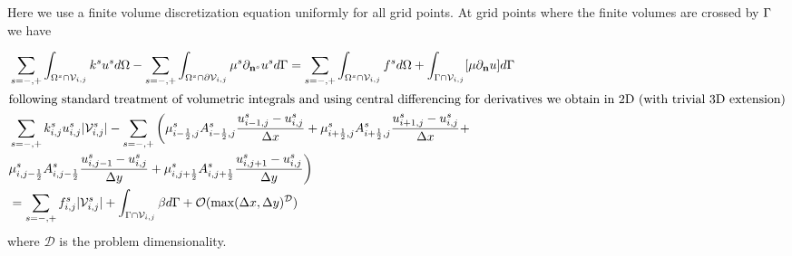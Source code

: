 \documentclass{elsarticle}
\begin{document}
Here we use a finite volume discretization equation uniformly for all grid points. At grid points where the finite volumes are crossed by $\rm \Gamma$ we have

\begin{align*}
	 & \sum_{s=-,+}\int_{\Omega^s \cap \mathcal{V}_{i,j}}  k^{s} u^{s} d\Omega -\sum_{s=-,+} \int_{\Omega^s\cap \partial\mathcal{V}_{i,j}} \mu^{s}\partial_{\mathbf{n}^s} u^s  d\Gamma = \sum_{s=-,+}\int_{\Omega^s \cap \mathcal{V}_{i,j}}  f^{s} d\Omega + \int_{\Gamma \cap \mathcal{V}_{i,j}}[\mu\partial_{\mathbf{n}}u]d\Gamma \\
	\intertext{following standard treatment of volumetric integrals and using central differencing for derivatives we obtain in 2D (with trivial 3D extension)}
	 & \sum_{s=-,+} k_{i,j}^s u_{i,j}^{s} |\mathcal{V}_{i,j}^s| - \sum_{s=-,+}\bigg( \mu_{i-\frac{1}{2},j}^s A_{i-\frac{1}{2},j}^s\frac{u_{i-1,j}^s - u_{i,j}^s}{\Delta x}     +   \mu_{i+\frac{1}{2},j}^s A_{i+\frac{1}{2},j}^s\frac{u_{i+1,j}^s - u_{i,j}^s}{\Delta x} +                                                          \\
	 & \mu_{i, j-\frac{1}{2}}^s A_{i, j-\frac{1}{2}}^s\frac{u_{i,j-1}^s - u_{i,j}^s}{\Delta y} + \mu_{i, j+\frac{1}{2}}^s A_{i, j+\frac{1}{2}}^s\frac{u_{i,j+1}^s - u_{i,j}^s}{\Delta y} \bigg)                                                                                                                                     \\
	 & =  \sum_{s=-,+} f_{i,j}^{s} |\mathcal{V}_{i,j}^s| + \int_{\Gamma\cap \mathcal{V}_{i,j}} \beta d\Gamma + \mathcal{O}(\max(\Delta x, \Delta y)^\mathcal{D})
\end{align*}
where $\mathcal{D}$ is the problem dimensionality.
\end{document}

